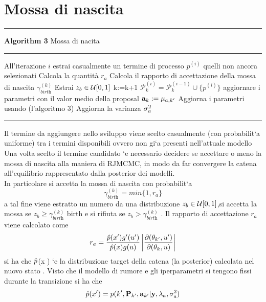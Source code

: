 \section{Mossa di nascita}
\hrule 
\textbf{Algorithm 3} Mossa di nacita
\hrule

\begin{algorithmic}
\State All'iterazione $i$ estrai casualmente un termine di processo $p^{(i)}$ quelli non ancora selezionati
\State Calcola la quantità $r_a$
\State Calcola il rapporto di accettazione della mossa di nascita $\gamma_{\textit{birth}}^{(k)}$
\State Estrai $z_b\in\mathcal{U}[0,1]$
\State k:=k+1
\State $ \mathcal{P}_k^{(i)}= \mathcal{P}_k^{(i-1)}\cup \{p^{(i)}\} $
\State aggiornare i parametri con il valor medio della proposal $\textbf{a}_k:=\mu_{a,k'}$
\Else
\State Aggiorna i parametri usando (l'algoritmo 3)
\State Aggiorna la varianza $\sigma_a^2$
\EndIf
\end{algorithmic}
\hrule
\vspace{2em}


Il termine da aggiungere nello sviluppo viene scelto casualmente (con probabilit`a
uniforme) tra i termini disponibili ovvero non gi`a presenti nell’attuale modello
Una volta scelto il termine candidato `e necessario decidere se accettare o meno la
mossa di nascita alla maniera di RJMCMC, in modo da far convergere la catena
all’equilibrio rappresentato dalla posterior dei modelli.\\
\vspace{2em}
In particolare si accetta la mossa di nascita con probabilit`a
\begin{equation}
\gamma_{\textit{birth}}^{(k)}=min\{1,r_a\}
\end{equation}
a tal fine viene estratto un numero da una distribuzione $z_b\in\mathcal{U}[0,1]$,si accetta la
mossa se $z_b\geq \gamma_{\textit{birth}}^{(k)}$ birth e si rifiuta se $z_b> \gamma_{\textit{birth}}^{(k)}$ .
Il rapporto di accettazione $r_a$ viene calcolato come
\begin{equation}
r_a=\frac{\hat{p}(x')g'(u')}{\hat{p}(x)g(u)}\left\vert\frac{\partial(\theta_{k'},u')}{\partial(\theta_{k},u)}\right\vert
\end{equation}
si ha che $\hat{p}$(x ) `e la distribuzione target della catena (la posterior) calcolata nel
nuovo stato . Visto che il modello di rumore e gli iperparametri si tengono fissi
durante la transizione si ha che
\begin{equation}
\hat{p}(x')=p(k',\textbf{P}_{k'},\textbf{a}_{k'}|\textbf{y},\lambda_a,\sigma_a^2)
\end{equation}

